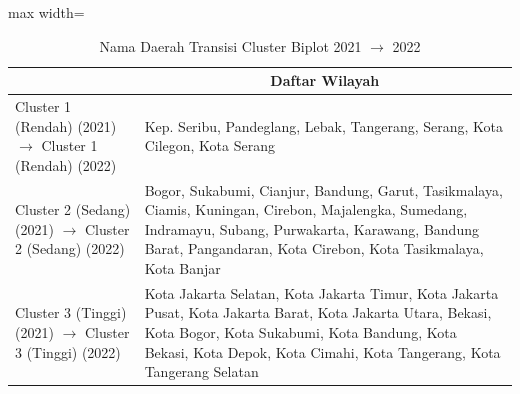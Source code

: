 \begin{table}[H]
\centering
\caption{Nama Daerah Transisi Cluster Biplot 2021 \(\rightarrow\) 2022} \label{tab:app1biplot_trans_name_2021x2022}
\begin{adjustbox}{max width=\textwidth}
\begin{tabular}{|>{\centering\arraybackslash}p{4cm}|p{10cm}|}
\hline
\multicolumn{1}{|c|}{\textbf{Kategori}} & \multicolumn{1}{c|}{\textbf{Daftar Wilayah}} \\
\hline
Cluster 1 (Rendah) (2021) \(\rightarrow\) Cluster 1 (Rendah) (2022) & Kep. Seribu, Pandeglang, Lebak, Tangerang, Serang, Kota Cilegon, Kota Serang \\
\hline
Cluster 2 (Sedang) (2021) \(\rightarrow\) Cluster 2 (Sedang) (2022) & Bogor, Sukabumi, Cianjur, Bandung, Garut, Tasikmalaya, Ciamis, Kuningan, Cirebon, Majalengka, Sumedang, Indramayu, Subang, Purwakarta, Karawang, Bandung Barat, Pangandaran, Kota Cirebon, Kota Tasikmalaya, Kota Banjar \\
\hline
Cluster 3 (Tinggi) (2021) \(\rightarrow\) Cluster 3 (Tinggi) (2022) & Kota Jakarta Selatan, Kota Jakarta Timur, Kota Jakarta Pusat, Kota Jakarta Barat, Kota Jakarta Utara, Bekasi, Kota Bogor, Kota Sukabumi, Kota Bandung, Kota Bekasi, Kota Depok, Kota Cimahi, Kota Tangerang, Kota Tangerang Selatan \\
\hline
\end{tabular}
\end{adjustbox}
\end{table}